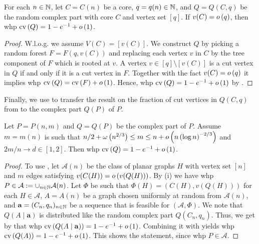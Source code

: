 \begin{lem}\label{lem:cut_vertices_complex}
For each $n\in\mathbb{N}$, let $C=C(n)$ be a core, $q=q(n)\in\mathbb{N}$, and $Q=Q(C,q)$ be the random complex part with core $C$ and vertex set $[q]$. If $v(C)=o\left(q\right)$, then whp $\operatorname{cv}\left(Q\right)=1-e^{-1}+o\left(1\right)$.
\end{lem}
\begin{proof}
W.l.o.g. we assume $V(C)=[v(C)]$. We construct $Q$ by picking a random forest $F=F(q,v(C))$ and replacing each vertex $v$ in $C$ by the tree component of $F$ which is rooted at $v$. A vertex $v\in [q]\setminus[v(C)]$ is a cut vertex in $Q$ if and only if it is a cut vertex in $F$. Together with the fact $v(C)=o\left(q\right)$ it implies  whp $\operatorname{cv}\left(Q\right)=\operatorname{cv}\left(F\right)+o\left(1\right)$. Hence, whp $\operatorname{cv}\left(Q\right)=1-e^{-1}+o\left(1\right)$ by .
\end{proof}
	
Finally, we use  to transfer the result on the fraction of cut vertices in $Q(C,q)$ from  to the complex part $Q(P)$ of $P$.
\begin{lem}\label{lem:cv_complex}
Let $P=P(n,m)$ and $Q=Q(P)$ be the complex part of $P$. Assume $m=m(n)$ is such that $n/2+\omega\left(n^{2/3}\right)\leq m \leq n+o\left(n\left(\log n\right)^{-2/3}\right)$ and $2m/n \to d\in[1,2]$. Then whp $\operatorname{cv}\left(Q\right)=1-e^{-1}+o\left(1\right)$.
\end{lem}
\begin{proof}
To use , let $\mathcal{A}(n)$ be the class of planar graphs $H$ with vertex set $[n]$ and $m$ edges satisfying $v(C(H))=o\left(v(Q(H))\right)$. By (i) we have whp $P\in\mathcal{A}:=\cup_{n\in\mathbb{N}}\mathcal{A}(n)$. Let $\Phi$ be such that $\Phi(H)=\left(C(H), v(Q(H))\right)$ for each $H\in\mathcal{A}$, $A=A(n)$ be a graph chosen uniformly at random from $\mathcal{A}(n)$, and $\mathbf{a}=(C_n, q_n)_{n\in\mathbb{N}}$ be a sequence that is feasible for $\left(\mathcal{A},\Phi\right)$. We note that $Q(A \mid \mathbf{a})$ is distributed like the random complex part $Q(C_n, q_n)$. Thus, we get by  that whp $\operatorname{cv}\left(Q(A \mid \mathbf{a})\right)=1-e^{-1}+o\left(1\right)$. Combining it with  yields whp $\operatorname{cv}\left(Q(A)\right)=1-e^{-1}+o\left(1\right)$. This shows the statement, since whp $P\in\mathcal{A}$.
\end{proof}
	
